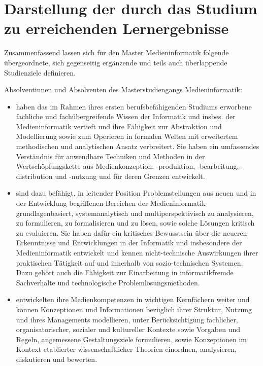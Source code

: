 \section{Darstellung der durch das Studium zu erreichenden
Lernergebnisse}\label{darstellung-der-durch-das-studium-zu-erreichenden-lernergebnisse}

Zusammenfassend lassen sich für den Master Medieninformatik folgende
übergeordnete, sich gegenseitig ergänzende und teils auch überlappende
Studienziele definieren.

Absolventinnen und Absolventen des Masterstudiengangs Medieninformatik:

\begin{itemize}
\item
  haben das im Rahmen ihres ersten berufsbefähigenden Studiums erworbene
  fachliche und fachübergreifende Wissen der Informatik und insbes. der
  Medieninformatik vertieft und ihre Fähigkeit zur Abstraktion und
  Modellierung sowie zum Operieren in formalen Welten mit erweitertem
  methodischen und analytischen Ansatz verbreitert. Sie haben ein
  umfassendes Verständnis für anwendbare Techniken und Methoden in der
  Wertschöpfungskette aus Medienkonzeption, -produktion, -bearbeitung,
  -distribution und -nutzung und für deren Grenzen entwickelt.
\item
  sind dazu befähigt, in leitender Position Problemstellungen aus neuen
  und in der Entwicklung begriffenen Bereichen der Medieninformatik
  grundlagenbasiert, systemanalytisch und multiperspektivisch zu
  analysieren, zu formulieren, zu formalisieren und zu lösen, sowie
  solche Lösungen kritisch zu evaluieren. Sie haben dafür ein kritisches
  Bewusstsein über die neueren Erkenntnisse und Entwicklungen in der
  Informatik und insbesondere der Medieninformatik entwickelt und kennen
  nicht-technische Auswirkungen ihrer praktischen Tätigkeit auf und
  innerhalb von sozio-technischen Systemen. Dazu gehört auch die
  Fähigkeit zur Einarbeitung in informatikfremde Sachverhalte und
  technologische Problemlösungsmethoden.
\item
  entwickelten ihre Medienkompetenzen in wichtigen Kernfächern weiter
  und können Konzeptionen und Informationen bezüglich ihrer Struktur,
  Nutzung und ihres Managements modellieren, unter Berücksichtigung
  fachlicher, organisatorischer, sozialer und kultureller Kontexte sowie
  Vorgaben und Regeln, angemessene Gestaltungsziele formulieren, sowie
  Konzeptionen im Kontext etablierter wissenschaftlicher Theorien
  einordnen, analysieren, diskutieren und bewerten.

\end{itemize}
